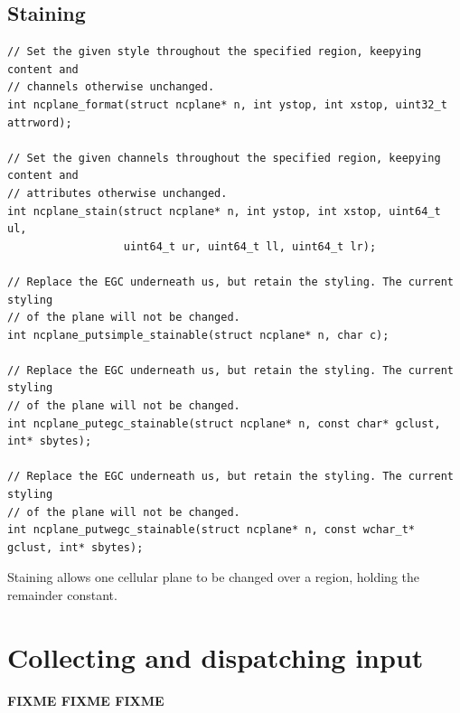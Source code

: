 \documentclass[letterpaper,10pt]{article}
\begin{document}
\subsection{Staining}
\label{sec:staining}
\begin{listing}[!htbp]
\begin{verbatim}
// Set the given style throughout the specified region, keepying content and
// channels otherwise unchanged.
int ncplane_format(struct ncplane* n, int ystop, int xstop, uint32_t attrword);

// Set the given channels throughout the specified region, keepying content and
// attributes otherwise unchanged.
int ncplane_stain(struct ncplane* n, int ystop, int xstop, uint64_t ul,
                  uint64_t ur, uint64_t ll, uint64_t lr);

// Replace the EGC underneath us, but retain the styling. The current styling
// of the plane will not be changed.
int ncplane_putsimple_stainable(struct ncplane* n, char c);

// Replace the EGC underneath us, but retain the styling. The current styling
// of the plane will not be changed.
int ncplane_putegc_stainable(struct ncplane* n, const char* gclust, int* sbytes);

// Replace the EGC underneath us, but retain the styling. The current styling
// of the plane will not be changed.
int ncplane_putwegc_stainable(struct ncplane* n, const wchar_t* gclust, int* sbytes);
\end{verbatim}
\caption{Staining allows one cellular plane to be changed over a region,
         holding the remainder constant.}
\label{list:stain}
\end{listing}

\newpage

\section{Collecting and dispatching input}
\label{sec:input}

\textbf{FIXME FIXME FIXME}
\end{document}
